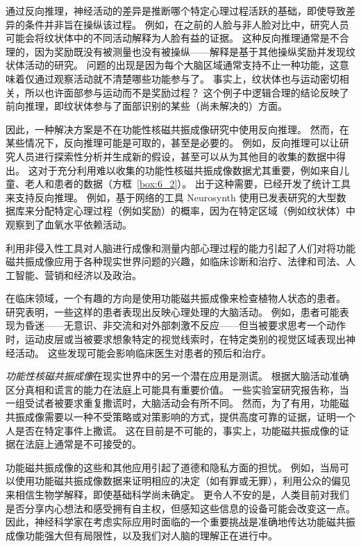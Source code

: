 通过反向推理，神经活动的差异是推断哪个特定心理过程活跃的基础，即使导致差异的条件并非旨在操纵该过程。 
例如，在之前的人脸与非人脸对比中，研究人员可能会将纹状体中的不同活动解释为人脸有益的证据。
这种反向推理通常是不合理的，因为奖励既没有被测量也没有被操纵——解释是基于其他操纵奖励并发现纹状体活动的研究。
问题的出现是因为每个大脑区域通常支持不止一种功能，这意味着仅通过观察活动就不清楚哪些功能参与了。
事实上，纹状体也与运动密切相关，所以也许面部参与运动而不是奖励过程？
这个例子中逻辑合理的结论反映了前向推理，即纹状体参与了面部识别的某些（尚未解决的）方面。


因此，一种解决方案是不在功能性核磁共振成像研究中使用反向推理。
然而，在某些情况下，反向推理可能是可取的，甚至是必要的。
例如，反向推理可以让研究人员进行探索性分析并生成新的假设，甚至可以从为其他目的收集的数据中得出。
这对于充分利用难以收集的功能性核磁共振成像数据尤其重要，例如来自儿童、老人和患者的数据（方框~\ref{box:6_2}）。
出于这种需要，已经开发了统计工具来支持反向推理。
例如，基于网络的工具 Neurosynth 使用已发表研究的大型数据库来分配特定心理过程（例如奖励）的概率，因为在特定区域（例如纹状体）中观察到了血氧水平依赖活动。


\begin{proposition}[现实世界中的大脑成像] \label{box:6_2}
	
	\quad \quad 利用非侵入性工具对人脑进行成像和测量内部心理过程的能力引起了人们对将功能磁共振成像应用于各种现实世界问题的兴趣，如临床诊断和治疗、法律和司法、人工智能、营销和经济以及政治。
	
	\quad \quad 在临床领域，一个有趣的方向是使用功能磁共振成像来检查植物人状态的患者。
	研究表明，一些这样的患者表现出反映心理处理的大脑活动。
	例如，患者可能表现为昏迷——无意识、非交流和对外部刺激不反应——但当被要求思考一个动作时，运动皮层或当被要求想象特定的视觉线索时，在特定类别的视觉区域表现出神经活动。
	这些发现可能会影响临床医生对患者的预后和治疗。
	
	\quad \quad \textit{功能性核磁共振成像}在现实世界中的另一个潜在应用是测谎。
	根据大脑活动准确区分真相和谎言的能力在法庭上可能具有重要价值。
	一些实验室研究报告称，当一组受试者被要求重复撒谎时，大脑活动会有所不同。
	然而，为了有用，功能磁共振成像需要以一种不受策略或对策影响的方式，提供高度可靠的证据，证明一个人是否在特定事件上撒谎。
	这在目前是不可能的，事实上，功能磁共振成像的证据在法庭上通常是不可接受的。
	
	\quad \quad 功能磁共振成像的这些和其他应用引起了道德和隐私方面的担忧。
	例如，当局可以使用功能磁共振成像数据来证明相应的决定（如有罪或无罪），利用公众的偏见来相信生物学解释，即使基础科学尚未确定。
	更令人不安的是，人类目前对我们是否分享内心想法和感受拥有自主权，但感知这些信息的设备可能会改变这一点。
	因此，神经科学家在考虑实际应用时面临的一个重要挑战是准确地传达功能磁共振成像功能强大但有局限性，以及我们对人脑的理解正在进行中。
	
\end{proposition}


